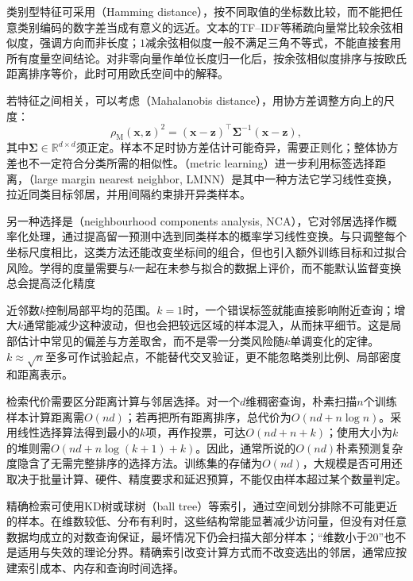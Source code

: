 类别型特征可采用（Hamming distance），按不同取值的坐标数比较，而不能把任意类别编码的数字差当成有意义的远近。文本的TF--IDF等稀疏向量常比较余弦相似度，强调方向而非长度；$1$减余弦相似度一般不满足三角不等式，不能直接套用所有度量空间结论。对非零向量作单位长度归一化后，按余弦相似度排序与按欧氏距离排序等价，此时可用欧氏空间中的解释。

若特征之间相关，可以考虑（Mahalanobis distance），用协方差调整方向上的尺度：
\begin{equation}
  \rho_{\mathrm{M}}(\bm{x},\bm{z})^2
  =(\bm{x}-\bm{z})^\top
   \bm{\Sigma}^{-1}(\bm{x}-\bm{z}),
  \label{eq:classification-mahalanobis}
\end{equation}
其中$\bm{\Sigma}\in\mathbb{R}^{d\times d}$须正定。样本不足时协方差估计可能奇异，需要正则化；整体协方差也不一定符合分类所需的相似性。（metric learning）进一步利用标签选择距离，（large margin nearest neighbor, LMNN）是其中一种方法它学习线性变换，拉近同类目标邻居，并用间隔约束排开异类样本。

另一种选择是（neighbourhood components analysis, NCA），它对邻居选择作概率化处理，通过提高留一预测中选到同类样本的概率学习线性变换。与只调整每个坐标尺度相比，这类方法还能改变坐标间的组合，但也引入额外训练目标和过拟合风险。学得的度量需要与$k$一起在未参与拟合的数据上评价，而不能默认监督变换总会提高泛化精度

近邻数$k$控制局部平均的范围。$k=1$时，一个错误标签就能直接影响附近查询；增大$k$通常能减少这种波动，但也会把较远区域的样本混入，从而抹平细节。这是局部估计中常见的偏差与方差取舍，而不是零一分类风险随$k$单调变化的定律。$k\approx\sqrt n$至多可作试验起点，不能替代交叉验证，更不能忽略类别比例、局部密度和距离表示。

检索代价需要区分距离计算与邻居选择。对一个$d$维稠密查询，朴素扫描$n$个训练样本计算距离需$O(nd)$；若再把所有距离排序，总代价为$O(nd+n\log n)$。采用线性选择算法得到最小的$k$项，再作投票，可达$O(nd+n+k)$；使用大小为$k$的堆则需$O(nd+n\log(k+1)+k)$。因此，通常所说的$O(nd)$朴素预测复杂度隐含了无需完整排序的选择方法。训练集的存储为$O(nd)$，大规模是否可用还取决于批量计算、硬件、精度要求和延迟预算，不能仅由样本超过某个数量判定。

精确检索可使用KD树或球树（ball tree）等索引，通过空间划分排除不可能更近的样本。在维数较低、分布有利时，这些结构常能显著减少访问量，但没有对任意数据均成立的对数查询保证，最坏情况下仍会扫描大部分样本；“维数小于20”也不是适用与失效的理论分界。精确索引改变计算方式而不改变选出的邻居，通常应按建索引成本、内存和查询时间选择。


